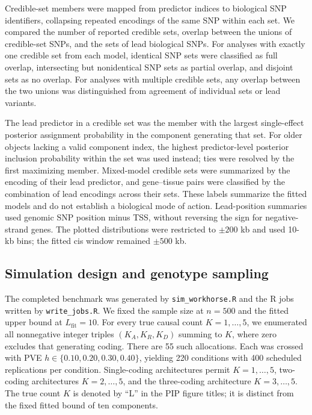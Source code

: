 \documentclass[12pt]{article}
\begin{document}
Credible-set members were mapped from predictor indices to biological
SNP identifiers, collapsing repeated encodings of the same SNP within
each set. We compared the number of reported credible sets, overlap
between the unions of credible-set SNPs, and the sets of lead biological
SNPs. For analyses with exactly one credible set from each model,
identical SNP sets were classified as full overlap, intersecting but
nonidentical SNP sets as partial overlap, and disjoint sets as no overlap.
For analyses with multiple credible sets, any overlap between the two
unions was distinguished from agreement of individual sets or lead
variants.

The lead predictor in a credible set was the member with the largest
single-effect posterior assignment probability in the component
generating that set. For older objects lacking a valid component index,
the highest predictor-level posterior inclusion probability within the
set was used instead; ties were resolved by the first maximizing member.
Mixed-model credible sets were summarized by the encoding of their
lead predictor, and gene--tissue pairs were classified by the combination
of lead encodings across their sets. These labels summarize the fitted
models and do not establish a biological mode of action. Lead-position
summaries used genomic SNP position minus TSS, without reversing the
sign for negative-strand genes. The plotted distributions were restricted
to $\pm 200$ kb and used 10-kb bins; the fitted cis window remained
$\pm 500$ kb.

\subsection{Simulation design and genotype sampling}

The completed benchmark was generated by \texttt{sim\_workhorse.R} and
the R jobs written by \texttt{write\_jobs.R}. We fixed the sample size
at $n=500$ and the fitted upper bound at $L_{\mathrm{fit}}=10$.
For every true causal count $K=1,\ldots,5$, we enumerated all
nonnegative integer triples $(K_A,K_R,K_D)$ summing to $K$, where zero
excludes that generating coding. There are 55 such allocations. Each
was crossed with PVE $h\in\{0.10,0.20,0.30,0.40\}$, yielding 220
conditions with 400 scheduled replications per condition. Single-coding
architectures permit $K=1,\ldots,5$, two-coding architectures
$K=2,\ldots,5$, and the three-coding architecture $K=3,\ldots,5$.
The true count $K$ is denoted by ``L'' in the PIP figure titles; it is
distinct from the fixed fitted bound of ten components.
\end{document}
